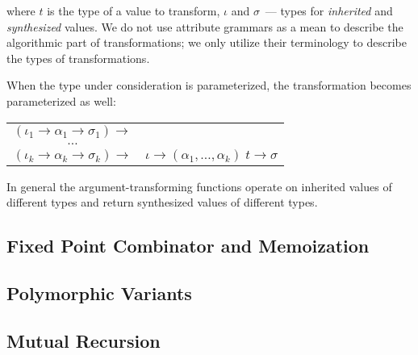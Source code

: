 where $t$ is the type of a value to transform, $\iota$ and $\sigma$~--- types for \emph{inherited} and \emph{synthesized} values. We do not use attribute
grammars as a mean to describe the algorithmic part of transformations; we only utilize their terminology to describe the types of transformations. 

When the type under consideration is parameterized, the transformation becomes parameterized as well:

\begin{tabular}{cl}
  $(\iota_1 \to \alpha_1 \to \sigma_1) \to$ & \\
  $\dots$                                  & \\
  $(\iota_k \to \alpha_k \to \sigma_k) \to$ & $\iota \to (\alpha_1,\dots,\alpha_k)\;t \to \sigma$
\end{tabular}

In general the argument-transforming functions operate on inherited values of different types and return synthesized values of different types.

\subsection{Fixed Point Combinator and Memoization}

\subsection{Polymorphic Variants}

\subsection{Mutual Recursion}

